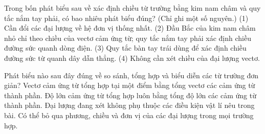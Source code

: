 \begin{ex}
Trong bốn phát biểu sau về xác định chiều từ trường bằng kim nam châm và quy tắc nắm tay phải, có bao nhiêu phát biểu đúng? (Chỉ ghi một số nguyên.) (1) Cần đổi các đại lượng về hệ đơn vị thống nhất. (2) Đầu Bắc của kim nam châm nhỏ chỉ theo chiều của vectơ cảm ứng từ; quy tắc nắm tay phải xác định chiều đường sức quanh dòng điện. (3) Quy tắc bàn tay trái dùng để xác định chiều đường sức từ quanh dây dẫn thẳng. (4) Không cần xét chiều của đại lượng vectơ.
\end{ex}

\begin{ex}
Phát biểu nào sau đây đúng về so sánh, tổng hợp và biểu diễn các từ trường đơn giản?
\choice
{\True Vectơ cảm ứng từ tổng hợp tại một điểm bằng tổng vectơ các cảm ứng từ thành phần.}
{Độ lớn cảm ứng từ tổng hợp luôn bằng tổng độ lớn các cảm ứng từ thành phần.}
{Đại lượng đang xét không phụ thuộc các điều kiện vật lí nêu trong bài.}
{Có thể bỏ qua phương, chiều và đơn vị của các đại lượng trong mọi trường hợp.}
\end{ex}

